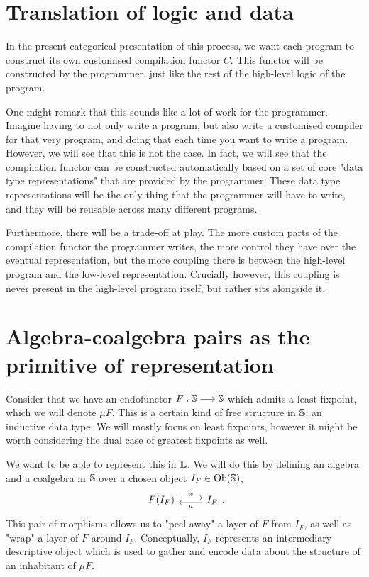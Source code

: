 \section{Translation of logic and data}

In the present categorical presentation of this process, we want each program
to construct its own customised compilation functor $C$. This functor will be
constructed by the programmer, just like the rest of the high-level logic of
the program.

One might remark that this sounds like a lot of work for the programmer.
Imagine having to not only write a program, but also write a customised
compiler for that very program, and doing that each time you want to write a
program. However, we will see that this is not the case. In fact, we will see
that the compilation functor can be constructed automatically based on a set of
core "data type representations" that are provided by the programmer. These
data type representations will be the only thing that the programmer will have
to write, and they will be reusable across many different programs.

Furthermore, there will be a trade-off at play. The more custom parts of the
compilation functor the programmer writes, the more control they have over the
eventual representation, but the more coupling there is between the high-level
program and the low-level representation. Crucially however, this coupling is
never present in the high-level program itself, but rather sits alongside it.

\section{Algebra-coalgebra pairs as the primitive of representation}

Consider that we have an endofunctor $F : \S \funct \S$ which admits a least
fixpoint, which we will denote $\mu F$. This is a certain kind of free
structure in $\S$: an inductive data type. We will mostly focus on least
fixpoints, however it might be worth considering the dual case of greatest
fixpoints as well.

We want to be able to represent this in $\L$. We will do this by defining an
algebra and a coalgebra in $\S$ over a chosen object $I_F \in \Ob(\S)$,
\begin{equation}
  \begin{tikzcd}
    F(I_F) \arrow[r, "w", shift left] & I_F \arrow[l, "u", shift left]
  \end{tikzcd}.
\end{equation}
This pair of morphisms allows us to "peel away" a layer of $F$ from $I_F$, as
well as "wrap" a layer of $F$ around $I_F$. Conceptually, $I_F$ represents an
intermediary descriptive object which is used to gather and encode data about
the structure of an inhabitant of $\mu F$.


